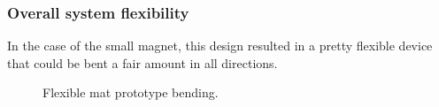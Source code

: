 \subsubsection{Overall system flexibility}
In the case of the small magnet, this design resulted in a pretty flexible device that could be bent a fair amount in all directions.
\begin{figure}
    \centering
    \begin{subfigure}[b]{0.475\textwidth}
        \centering
    \end{subfigure}
    \hfill
    \begin{subfigure}[b]{0.475\textwidth}  
        \centering 
    \end{subfigure}
    \caption{Flexible mat prototype bending.}
    \label{fig: Flexible_mat_bending}
\end{figure}

